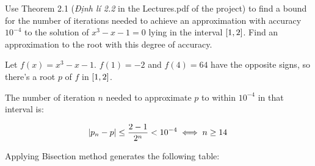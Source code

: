 \documentclass[../../../../Assignments.tex]{subfiles}
\begin{document}
\begin{exercise}
    Use Theorem 2.1 (\emph{Định lí 2.2} in the Lectures.pdf of the project) to
    find a bound for the number of iterations needed to achieve an approximation
    with accuracy \(10^{-4}\) to the solution of \(x^3 - x − 1 = 0\) lying in
    the interval \(\interval{1}{2}\). Find an approximation to the root with
    this degree of accuracy.
\end{exercise}

\begin{solution}
    Let \(f(x) = x^3 - x − 1\). \(f(1) = -2\) and \(f(4) = 64\) have the
    opposite signs, so there's a root \(p\) of \(f\) in \(\interval{1}{2}\).

    The number of iteration \(n\) needed to approximate \(p\) to within
    \(10^{-4}\) in that interval is:

    \[\abs{p_n - p} \leq \frac{2 - 1}{2^n} < 10^{-4} \iff n \geq 14\]

    Applying Bisection method generates the following table:


\end{solution}
\end{document}
